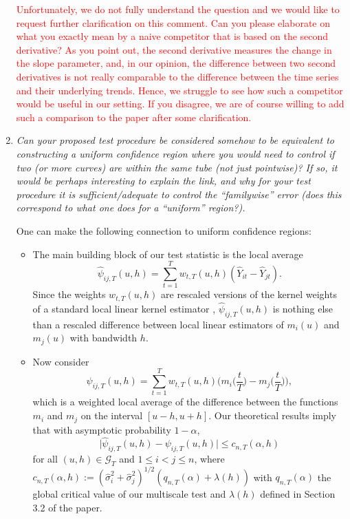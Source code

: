 \documentclass[a4paper,12pt]{article}
\begin{document}
\begin{enumerate}[label=\arabic*.,leftmargin=0.6cm]
\textcolor{red}{Unfortunately, we do not fully understand the question and we would like to request further clarification on this comment. Can you please elaborate on what you exactly mean by a naive competitor that is based on the second derivative? As you point out, the second derivative measures the change in the slope parameter, and, in our opinion, the difference between two second derivatives is not really comparable to the difference between the time series and their underlying trends. Hence, we struggle to see how such a competitor would be useful in our setting. If you disagree, we are of course willing to add such a comparison to the paper after some clarification.}


\item \textit{Can your proposed test procedure be considered somehow to be equivalent to constructing a uniform confidence region where you would need to control if two (or more curves) are within the same tube (not just pointwise)? If so, it would be perhaps interesting to explain the link, and why for your test procedure it is sufficient/adequate to control the ``familywise'' error (does this correspond to what one does for a ``uniform'' region?).}

One can make the following connection to uniform confidence regions: 
\begin{itemize}[leftmargin=0.45cm,itemsep=0pt,topsep=0pt]

\item The main building block of our test statistic is the local average
\[ \widehat{\psi}_{ij,T}(u,h) = \sum_{t=1}^T w_{t,T}(u,h) (\widehat{Y}_{it} - \widehat{Y}_{jt}). \]
Since the weights $w_{t,T}(u,h)$ are rescaled versions of the kernel weights of a standard local linear kernel estimator \citep{FanGijbels1996}, $\widehat{\psi}_{ij,T}(u,h)$ is nothing else than a rescaled difference between local linear estimators of $m_i(u)$ and $m_j(u)$ with bandwidth $h$. 

\item Now consider 
\[ \psi_{ij,T}(u,h) = \sum_{t=1}^T w_{t,T}(u,h) \Big(m_i\Big(\frac{t}{T}\Big) - m_j\Big(\frac{t}{T}\Big)\Big), \]
which is a weighted local average of the difference between the functions $m_i$ and $m_j$ on the interval $[u-h,u+h]$. Our theoretical results imply that with asymptotic probability $1-\alpha$, 
\[ \big| \widehat{\psi}_{ij,T}(u,h) - \psi_{ij,T}(u,h) \big| \le c_{n,T}(\alpha,h) \]
for all $(u,h) \in \mathcal{G}_T$ and $1 \le i < j \le n$, where $c_{n,T}(\alpha,h) := (\widehat{\sigma}_i^2 + \widehat{\sigma}_j^2)^{1/2} (q_{n,T}(\alpha) + \lambda(h))$ with $q_{n,T}(\alpha)$ the global critical value of our multiscale test and $\lambda(h)$ defined in Section 3.2 of the paper. 


\end{itemize}
\end{enumerate}
\end{document}
